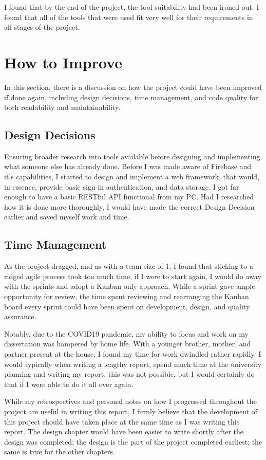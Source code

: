 I found that by the end of the project, the tool suitability had been ironed out. I found that all of the tools that were used fit very well for their requirements in all stages of the project.

\section{How to Improve}

In this section, there is a discussion on how the project could have been improved if done again, including design decisions, time management, and code quality for both readability and maintainability.

    \subsection{Design Decisions}
    Ensuring broader research into tools available before designing and implementing what someone else has already done. Before I was made aware of Firebase and it's capabilities, I started to design and implement a web framework, that would, in essence, provide basic sign-in authentication, and data storage. I got far enough to have a basic RESTful API functional from my PC. Had I researched how it is done more thoroughly, I would have made the correct Design Decision earlier and saved myself work and time.
    
    \subsection{Time Management}
    As the project dragged, and as with a team size of 1, I found that sticking to a ridged agile process took too much time, if I were to start again, I would do away with the sprints and adopt a Kanban only approach. While a sprint gave ample opportunity for review, the time spent reviewing and rearranging the Kanban board every sprint could have been spent on development, design, and quality assurance.
    
    Notably, due to the COVID19 pandemic, my ability to focus and work on my dissertation was hampered by home life. With a younger brother, mother, and partner present at the house, I found my time for work dwindled rather rapidly. I would typically when writing a lengthy report, spend much time at the university planning and writing my report, this was not possible, but I would certainly do that if I were able to do it all over again.
    
    While my retrospectives and personal notes on how I progressed throughout the project are useful in writing this report, I firmly believe that the development of this project should have taken place at the same time as I was writing this report. The design chapter would have been easier to write shortly after the design was completed; the design is the part of the project completed earliest; the same is true for the other chapters.
    
